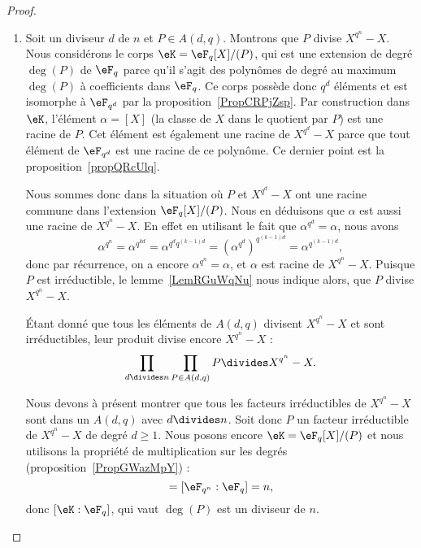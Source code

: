 \begin{proof}
	\begin{enumerate}
		\item
		      Soit un diviseur \( d\) de \( n\) et \( P\in A(d,q)\). Montrons que \( P\) divise \( X^{q^n}-X\). Nous considérons le corps \( \eK=\eF_q[X]/(P)\), qui est une extension de degré \( \deg(P)\) de \( \eF_q\) parce qu'il s'agit des polynômes de degré au maximum \( \deg(P)\) à coefficients dans \( \eF_q\). Ce corps possède donc \( q^d\) éléments et est isomorphe à \( \eF_{q^d}\) par la proposition~\ref{PropCRPjZsp}. Par construction dans \( \eK\), l'élément \( \alpha=[X]\) (la classe de \( X\) dans le quotient par \( P\)) est une racine de \( P\). Cet élément est également une racine de \( X^{q^d}-X\) parce que tout élément de \( \eF_{q^d}\) est une racine de ce polynôme. Ce dernier point est la proposition~\ref{propQRcUlq}.

		      Nous sommes donc dans la situation où \( P\) et \( X^{q^d}-X\) ont une racine commune dans l'extension \( \eF_q[X]/(P)\). Nous en déduisons que \( \alpha\) est aussi une racine de \( X^{q^n}-X\). En effet en utilisant le fait que \( \alpha^{q^d}=\alpha\), nous avons
		      \begin{equation}
			      \alpha^{q^n}=\alpha^{q^{kd}}=\alpha^{q^dq^{(k-1)d}}=\left( \alpha^{q^d} \right)^{q^{(k-1)d}}=\alpha^{q^{(k-1)d}},
		      \end{equation}
		      donc par récurrence, on a encore \( \alpha^{q^n}=\alpha\), et \( \alpha\) est racine de \( X^{q^n}-X\). Puisque \( P\) est irréductible, le lemme~\ref{LemRGuWqNu} nous indique alors, que \( P\) divise \( X^{q^n}-X\).

		      Étant donné que tous les éléments de \( A(d,q)\) divisent \( X^{q^n}-X\) et sont irréductibles, leur produit divise encore \( X^{q^n}-X\) :
		      \begin{equation}
			      \prod_{d\divides n}\prod_{P\in A(d,q)}P\divides X^{q^n}-X.
		      \end{equation}

		      Nous devons à présent montrer que tous les facteurs irréductibles de \( X^{q^n}-X\) sont dans un \( A(d,q)\) avec \( d\divides n\). Soit donc \( P\) un facteur irréductible de \( X^{q^n}-X\) de degré \( d\geq 1\). Nous posons encore \( \eK=\eF_q[X]/(P)\) et nous utilisons la propriété de multiplication sur les degrés (proposition~\ref{PropGWazMpY}) :
		      \begin{equation}
			      [\eF_{q^n}:\eK][\eK:\eF_q]=[\eF_{q^n}:\eF_q]=n,
		      \end{equation}
		      donc \( [\eK:\eF_q]\), qui vaut \( \deg(P)\) est un diviseur de \( n\).


\end{enumerate}
\end{proof}
